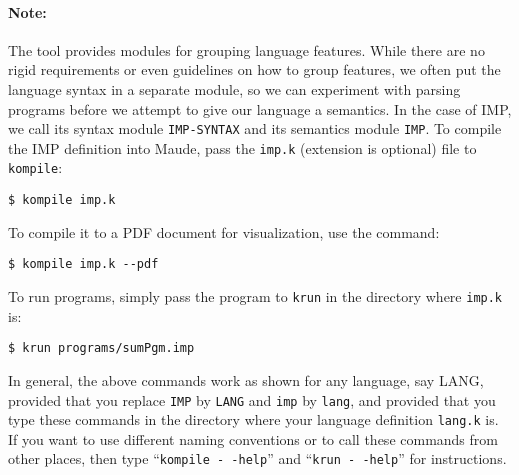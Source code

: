 \begin{latexComment}
\paragraph{Note:}{
The \K tool provides modules for grouping language features.  While
there are no rigid requirements or even guidelines on how to group
features, we often put the language syntax in a separate module, so we
can experiment with parsing programs before we attempt to give our
language a semantics.  In the case of IMP, we call its syntax module
\texttt{IMP-SYNTAX} and its semantics module \texttt{IMP}.  To compile
the IMP definition into Maude, pass the \texttt{imp.k}
(extension is optional) file to \texttt{kompile}:
\begin{verbatim}
$ kompile imp.k
\end{verbatim}
To compile it to a PDF document for visualization, use the command:
\begin{verbatim}
$ kompile imp.k --pdf
\end{verbatim}
To run programs, simply pass the program to \texttt{krun} in the
directory where \texttt{imp.k} is:
\begin{verbatim}
$ krun programs/sumPgm.imp
\end{verbatim}
In general, the above commands work as shown for any language, say
LANG, provided that you replace \texttt{IMP} by \texttt{LANG} and
\texttt{imp} by \texttt{lang}, and provided that you type these
commands in the directory where your language definition
\texttt{lang.k} is.  If you want to use different naming
conventions or to call these commands from other places, then type
``\texttt{kompile -\,\!-help}'' and ``\texttt{krun -\,\!-help}'' for
instructions.
}

\end{latexComment}

\vspace*{3ex}
